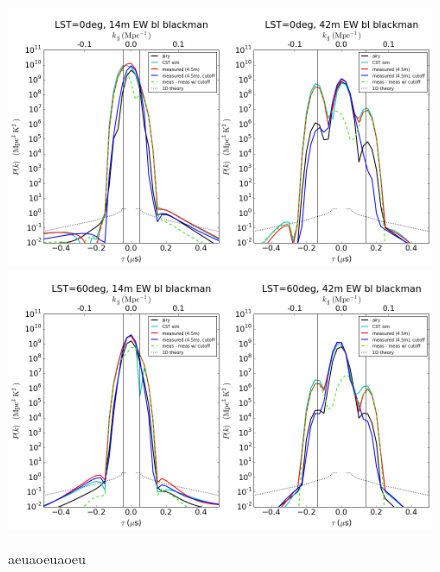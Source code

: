 \documentclass[preprint]{aastex}
\begin{document}
\begin{figure}[h]
\includegraphics[width=5.5in]{LST0deg_14m_42m_EWbaselinesblackman.png}
\includegraphics[width=5.5in]{LST60deg_14m_42m_EWbaselinesblackman.png}
\caption{aeuaoeuaoeu}
\label{fig:delayspec}
\end{figure}
\end{document}
